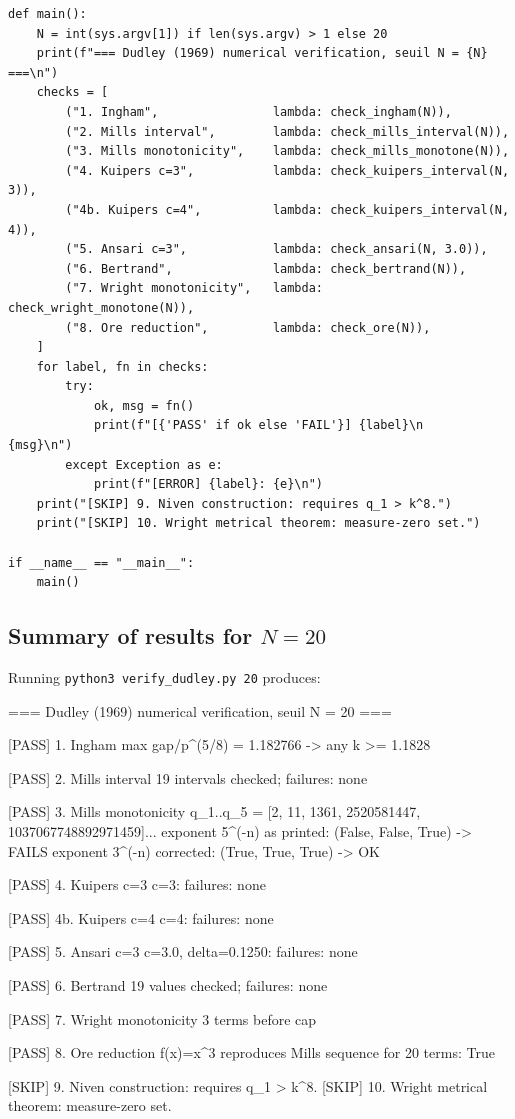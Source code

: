 \documentclass[11pt,reqno]{amsart}
\theoremstyle{redplain}
\numberwithin{equation}{section}
\begin{document}
\begin{lstlisting}[style=python]
def main():
    N = int(sys.argv[1]) if len(sys.argv) > 1 else 20
    print(f"=== Dudley (1969) numerical verification, seuil N = {N} ===\n")
    checks = [
        ("1. Ingham",                lambda: check_ingham(N)),
        ("2. Mills interval",        lambda: check_mills_interval(N)),
        ("3. Mills monotonicity",    lambda: check_mills_monotone(N)),
        ("4. Kuipers c=3",           lambda: check_kuipers_interval(N, 3)),
        ("4b. Kuipers c=4",          lambda: check_kuipers_interval(N, 4)),
        ("5. Ansari c=3",            lambda: check_ansari(N, 3.0)),
        ("6. Bertrand",              lambda: check_bertrand(N)),
        ("7. Wright monotonicity",   lambda: check_wright_monotone(N)),
        ("8. Ore reduction",         lambda: check_ore(N)),
    ]
    for label, fn in checks:
        try:
            ok, msg = fn()
            print(f"[{'PASS' if ok else 'FAIL'}] {label}\n        {msg}\n")
        except Exception as e:
            print(f"[ERROR] {label}: {e}\n")
    print("[SKIP] 9. Niven construction: requires q_1 > k^8.")
    print("[SKIP] 10. Wright metrical theorem: measure-zero set.")

if __name__ == "__main__":
    main()
\end{lstlisting}

\subsection{Summary of results for $N=20$}

Running \texttt{python3 verify\_dudley.py 20} produces:

\begin{verbatimbox}
=== Dudley (1969) numerical verification, seuil N = 20 ===

[PASS] 1. Ingham
        max gap/p^(5/8) = 1.182766  ->  any k >= 1.1828

[PASS] 2. Mills interval
        19 intervals checked; failures: none

[PASS] 3. Mills monotonicity
        q_1..q_5 = [2, 11, 1361, 2520581447, 1037067748892971459]...
            exponent 5^(-n) as printed: (False, False, True)  ->  FAILS
            exponent 3^(-n) corrected:  (True, True, True)  ->  OK

[PASS] 4. Kuipers c=3
        c=3: failures: none

[PASS] 4b. Kuipers c=4
        c=4: failures: none

[PASS] 5. Ansari c=3
        c=3.0, delta=0.1250: failures: none

[PASS] 6. Bertrand
        19 values checked; failures: none

[PASS] 7. Wright monotonicity
        3 terms before cap

[PASS] 8. Ore reduction
        f(x)=x^3 reproduces Mills sequence for 20 terms: True

[SKIP] 9. Niven construction: requires q_1 > k^8.
[SKIP] 10. Wright metrical theorem: measure-zero set.
\end{verbatimbox}
\end{document}
